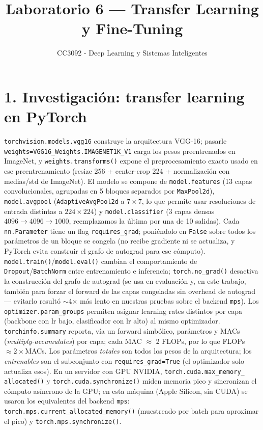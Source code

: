 \documentclass[9pt]{article}
\title{\vspace{-1.6em}\textbf{Laboratorio 6 --- Transfer Learning y Fine-Tuning}\vspace{-0.6em}}
\author{CC3092 - Deep Learning y Sistemas Inteligentes}
\date{}
\begin{document}
\maketitle
\vspace{-2.3em}

\section*{1. Investigación: transfer learning en PyTorch}
\footnotesize
\texttt{torchvision.models.vgg16} construye la arquitectura VGG-16; pasarle
\texttt{weights=VGG16\_Weights.IMAGENET1K\_V1} carga los pesos preentrenados en ImageNet, y
\texttt{weights.transforms()} expone el preprocesamiento exacto usado en ese preentrenamiento
(resize 256 + center-crop 224 + normalización con medias/std de ImageNet). El modelo se compone de
\texttt{model.features} (13 capas convolucionales, agrupadas en 5 bloques separados por
\texttt{MaxPool2d}), \texttt{model.avgpool} (\texttt{AdaptiveAvgPool2d} a $7\times7$, lo que permite
usar resoluciones de entrada distintas a $224\times224$) y \texttt{model.classifier} (3 capas
densas $4096\to4096\to1000$, reemplazamos la última por una de 10 salidas). Cada \texttt{nn.Parameter}
tiene un flag \texttt{requires\_grad}; poniéndolo en \texttt{False} sobre todos los parámetros de un
bloque se congela (no recibe gradiente ni se actualiza, y PyTorch evita construir el grafo de
autograd para ese cómputo). \texttt{model.train()}/\texttt{model.eval()} cambian el comportamiento
de \texttt{Dropout}/\texttt{BatchNorm} entre entrenamiento e inferencia; \texttt{torch.no\_grad()}
desactiva la construcción del grafo de autograd (se usa en evaluación y, en este trabajo, también
para forzar el forward de las capas congeladas sin overhead de autograd --- evitarlo resultó
$\sim$4$\times$ más lento en nuestras pruebas sobre el backend \texttt{mps}). Los
\texttt{optimizer.param\_groups} permiten asignar learning rates distintos por capa (backbone con lr
bajo, clasificador con lr alto) al mismo optimizador. \texttt{torchinfo.summary} reporta, vía un
forward simbólico, parámetros y MACs (\emph{multiply-accumulates}) por capa; cada MAC $\approx$ 2
FLOPs, por lo que FLOPs $\approx 2\times$MACs. Los parámetros \emph{totales} son todos los pesos de
la arquitectura; los \emph{entrenables} son el subconjunto con \texttt{requires\_grad=True}
(el optimizador solo actualiza esos). En un servidor con GPU NVIDIA, \texttt{torch.cuda.max\_memory\_%
allocated()} y \texttt{torch.cuda.synchronize()} miden memoria pico y sincronizan el cómputo
asíncrono de la GPU; en esta máquina (Apple Silicon, sin CUDA) se usaron los equivalentes del
backend \texttt{mps}: \texttt{torch.mps.current\_allocated\_memory()} (muestreado por batch para
aproximar el pico) y \texttt{torch.mps.synchronize()}.
\end{document}

